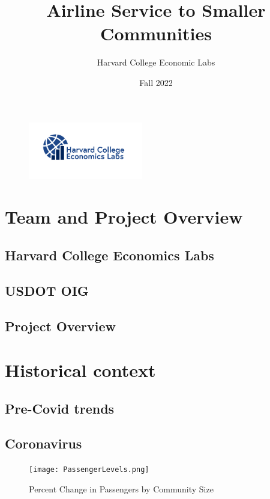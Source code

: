 \documentclass[11pt]{article}
\begin{document}
\title{\textbf{Airline Service to Smaller Communities}}
\author{Harvard College Economic Labs}
\date{Fall 2022}
\begin{figure}[t]
\centering
\includegraphics[width=5cm]{Eclabs_logo.png}
\end{figure}

\maketitle

\newpage
\tableofcontents
\newpage

\section{Team and Project Overview}
\subsection{Harvard College Economics Labs}
\subsection{USDOT OIG}
\subsection{Project Overview}

\section{Historical context}
\subsection{Pre-Covid trends}

\subsection{Coronavirus}

\begin{figure}[htbp!]
\centerline{\texttt{[image: PassengerLevels.png]}}
\caption{Percent Change in Passengers by Community Size}
\label{percent_change_passengers}
\end{figure}
\end{document}
